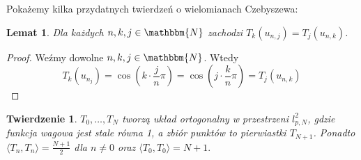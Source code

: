 \documentclass[12pt,wide]{mwart}
\newtheorem{tw}{Twierdzenie}
\newtheorem{lem}{Lemat}
\begin{document}
Pokażemy kilka przydatnych twierdzeń o wielomianach Czebyszewa:
\begin{lem}
Dla każdych $n,k,j \in \mathbbm{N}$ zachodzi $T_k(u_{n,j}) = T_j(u_{n,k})$.
\end{lem}
\begin{proof}
Weźmy dowolne $n,k,j \in \mathbbm{N}$. Wtedy 
$$
T_k(u_{n_j}) = \cos(k\cdot \frac{j}{n}\pi) = \cos(j\cdot \frac{k}{n}\pi) = T_j(u_{n,k})
$$
\end{proof}
\begin{tw}
$T_0,\ldots,T_N$ tworzą układ ortogonalny w przestrzeni $l^2_{p,N}$, gdzie funkcja wagowa jest stale równa 1, a zbiór punktów to pierwiastki $T_{N+1}$. Ponadto $\langle T_n,T_n \rangle = \frac{N+1}{2}$ dla $n \neq 0$ oraz $\langle T_0,T_0 \rangle = N+1.$  
\end{tw}
\end{document}
